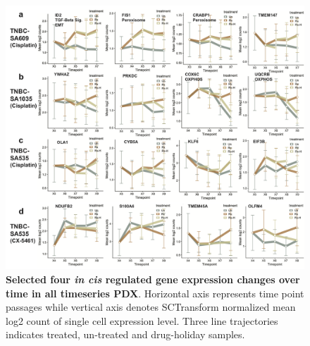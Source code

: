 \begin{figure}
\centering
 \includegraphics[width=\textwidth]{Figures/chap5/incisgenelinetrajectories.png}
	
\caption[Four \textit{in cis} gene expression changed over time]
	{\small
	 \textbf{Selected four \textit{in cis} regulated gene expression changes over time in all timeseries PDX}.
	Horizontal axis represents time point passages while vertical axis denotes SCTransform normalized mean log2 count of single cell expression level. Three line trajectories indicates treated, un-treated and drug-holiday samples. }

	\label{fig:incisgenelinetrajectories}
\end{figure}


